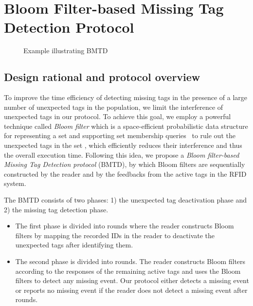 \documentclass[10pt, twocolumn]{IEEEtran}
\begin{document}
\section{Bloom Filter-based Missing Tag Detection Protocol}
\label{sec:protocol}

\begin{figure*}[htbp]
\centering
{}
\caption{Example illustrating BMTD}
\end{figure*}

\subsection{Design rational and protocol overview}
To improve the time efficiency of detecting missing tags in the presence of a large number of unexpected tags in the population, we limit the interference of unexpected tags in our protocol. To achieve this goal, we employ a powerful technique called \textit{Bloom filter} which is a space-efficient probabilistic data structure for representing a set and supporting set membership queries~\cite{bloom1970space} to rule out the unexpected tags in the set , which efficiently reduces their interference and thus the overall execution time. Following this idea, we propose a \textit{Bloom filter-based Missing Tag Detection protocol} (BMTD), by which Bloom filters are sequentially constructed by the reader and by the feedbacks from the active tags in the RFID system.

The BMTD consists of two phases: 1) the unexpected tag deactivation phase and 2) the missing tag detection phase.
\begin{itemize}
\item The first phase is divided into  rounds where the reader constructs  Bloom filters by mapping the recorded IDs in the reader to deactivate the unexpected tags after identifying them.
\item The second phase is divided into  rounds. The reader constructs  Bloom filters according to the responses of the remaining active tags and uses the Bloom filters to detect any missing event. Our protocol either detects a missing event or reports no missing event if the reader does not detect a missing event after  rounds.
\end{itemize}
\end{document}
